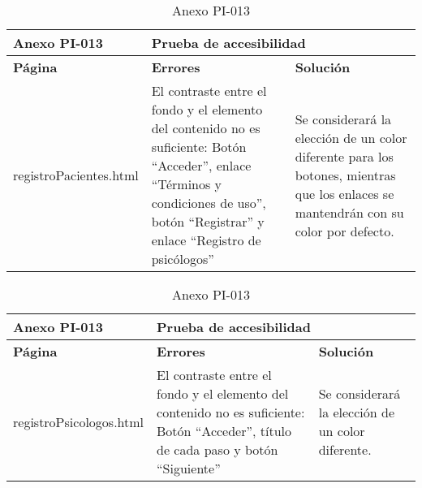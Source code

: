 \begin{table}[htpb]
\centering
\begin{tabularx}{\textwidth}{|l|X|X|}
\hline
\rowcolor[gray]{0.9}\textbf{Anexo PI-013}  & \multicolumn{2}{l|}{\textbf{Prueba de accesibilidad}}                                                                                                                                                                                                                                                                \\ \hline
\textbf{Página}        & \textbf{Errores}                                                                                                                                                               & \textbf{Solución}                                                                                                                   \\ \hline
registroPacientes.html & El contraste entre el fondo y el elemento del contenido no es suficiente: Botón “Acceder”, enlace “Términos y condiciones de uso”, botón “Registrar” y enlace “Registro de psicólogos” & Se considerará la elección de un color diferente para los botones, mientras que los enlaces se mantendrán con su color por defecto. \\ \hline
\end{tabularx}
\caption{Anexo PI-013}
\end{table}


\begin{table}[htpb]
\centering
\begin{tabularx}{\textwidth}{|l|X|X|}
\hline
\rowcolor[gray]{0.9}\textbf{Anexo PI-013}   & \multicolumn{2}{l|}{\textbf{Prueba de accesibilidad}}                                                                                                                            \\ \hline
\textbf{Página}         & \textbf{Errores}                                                                                                             & \textbf{Solución}                                 \\ \hline
registroPsicologos.html & El contraste entre el fondo y el elemento del contenido no es suficiente: Botón “Acceder”, título de cada paso y botón “Siguiente” & Se considerará la elección de un color diferente. \\ \hline
\end{tabularx}
\caption{Anexo PI-013}
\end{table}



